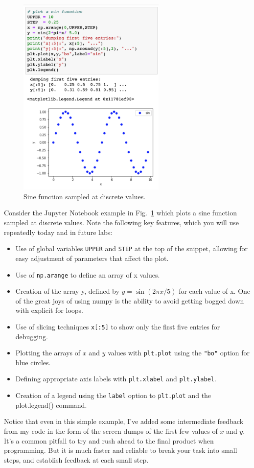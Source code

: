 \begin{figure}[htbp]
\begin{center}
\includegraphics[width=0.65\textwidth]{figs/plotting/plotting.png} 
\caption{Sine function sampled at discrete values.}
\label{fig:plotsin}
\end{center}
\end{figure}

Consider the Jupyter Notebook example in Fig.~\ref{fig:plotsin} which
plots a sine function sampled at discrete values.  Note the following
key features, which you will use repeatedly today and in future labs:
\begin{itemize}
\item Use of global variables {\tt UPPER} and {\tt STEP} at the top of the snippet, allowing for easy adjustment of parameters that affect the plot.
\item Use of {\tt np.arange} to define an array of x values.
\item Creation of the array y, defined by $y = \sin(2\pi x / 5)$ for each value of x.  One of the great joys of using numpy is the ability to avoid getting bogged down with explicit for loops.
\item Use of slicing techniques {\tt x[:5]} to show only the first five entries for debugging.  
\item Plotting the arrays of $x$ and $y$ values with {\tt plt.plot}  using the {\tt "bo"} option for blue circles.
\item Defining appropriate axis labels with {\tt plt.xlabel} and {\tt plt.ylabel}. 
\item Creation of a legend using the {\tt label} option to {\tt plt.plot} and the {plot.legend()} command.
\end{itemize}
Notice that even in this simple example, I've added some intermediate
feedback from my code in the form of the screen dumps of the first few
values of $x$ and $y$.  It's a common pitfall to try and rush ahead to
the final product when programming.  But it is much faster and
reliable to break your task into small steps, and establish feedback
at each small step.

